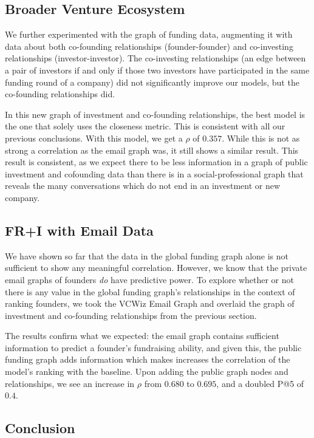 \subsection{Broader Venture Ecosystem}

We further experimented with the graph of funding data, augmenting it with data about both co-founding relationships (founder-founder) and co-investing relationships (investor-investor). The co-investing relationships (an edge between a pair of investors if and only if those two investors have participated in the same funding round of a company) did not significantly improve our models, but the co-founding relationships did.

In this new graph of investment and co-founding relationships, the best model is the one that solely uses the closeness metric. This is consistent with all our previous conclusions. With this model, we get a $\rho$ of $0.357$. While this is not as strong a correlation as the email graph was, it still shows a similar result. This result is consistent, as we expect there to be less information in a graph of public investment and cofounding data than there is in a social-professional graph that reveals the many conversations which do not end in an investment or new company.

\subsection{FR+I with Email Data}

We have shown so far that the data in the global funding graph alone is not sufficient to show any meaningful correlation. However, we know that the private email graphs of founders \textit{do} have predictive power. To explore whether or not there is any value in the global funding graph's relationships in the context of ranking founders, we took the VCWiz Email Graph and overlaid the graph of investment and co-founding relationships from the previous section.

The results confirm what we expected: the email graph contains sufficient information to predict a founder's fundraising ability, and given this, the public funding graph adds information which makes increases the correlation of the model's ranking with the baseline. Upon adding the public graph nodes and relationships, we see an increase in $\rho$ from $0.680$ to $0.695$, and a doubled P@5 of $0.4$.

\subsection{Conclusion}

